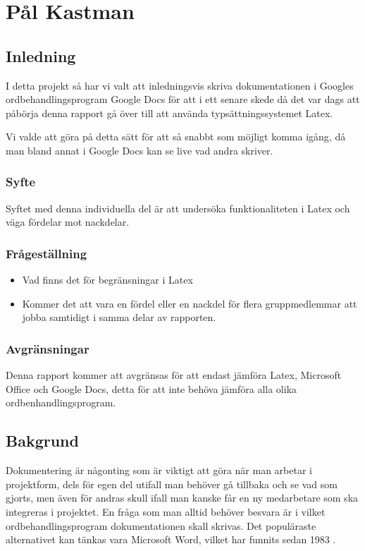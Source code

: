 \section{Pål Kastman}
\subsection{Inledning}
I detta projekt så har vi valt att inledningsvis skriva dokumentationen i Googles ordbehandlingsprogram Google Docs för att 
i ett senare skede då det var dags att påbörja denna rapport gå över till att använda typsättningssystemet Latex. 

Vi valde att göra på detta sätt för att så snabbt som möjligt komma igång, då man bland annat i Google Docs kan se live 
vad andra skriver.

\subsubsection{Syfte}
Syftet med denna individuella del är att undersöka funktionaliteten i Latex och väga fördelar mot nackdelar.

\subsubsection{Frågeställning}
\begin{itemize}
\item Vad finns det för begränsningar i Latex
\item Kommer det att vara en fördel eller en nackdel för flera gruppmedlemmar att jobba samtidigt i samma delar av rapporten.
\end{itemize}

\subsubsection{Avgränsningar}
Denna rapport kommer att avgränsas för att endast jämföra Latex, Microsoft Office och Google Docs, detta för att 
inte behöva jämföra alla olika ordbenhandlingsprogram.

\subsection{Bakgrund}
Dokumentering är någonting som är viktigt att göra när man arbetar i projektform, dels för egen del utifall man behöver 
gå tillbaka och se vad som gjorts, men även för andras skull ifall man kanske får en ny medarbetare som ska integreras i 
projektet. En fråga som man alltid behöver besvara är i vilket ordbehandlingsprogram dokumentationen skall skrivas. Det populäraste 
alternativet kan tänkas vara Microsoft Word, vilket har funnits sedan 1983 \cite{word_ursprung}.


